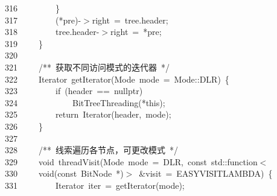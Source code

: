 \documentclass[11pt,a4paper]{ctexart}
\newcommand{\hlstd}[1]{\textcolor[rgb]{0.2,0.2,0.2}{#1}}
\newcommand{\hlcom}[1]{\textcolor[rgb]{0.59,0.59,0.59}{#1}}
\newcommand{\hlopt}[1]{\textcolor[rgb]{0.2,0.2,0.2}{#1}}
\newcommand{\hllin}[1]{\textcolor[rgb]{0.59,0.59,0.59}{#1}}
\newcommand{\hlkwa}[1]{\textcolor[rgb]{0.23,0.42,0.78}{#1}}
\newcommand{\hlkwb}[1]{\textcolor[rgb]{0.63,0,0.31}{#1}}
\newcommand{\hlkwc}[1]{\textcolor[rgb]{0,0.63,0.31}{#1}}
\newcommand{\hlkwd}[1]{\textcolor[rgb]{0.78,0.23,0.41}{#1}}
\begin{document}
\hllin{316\ }\hlstd{}\hlstd{\ \ \ \ \ \ \ \ }\hlstd{}\hlopt{\}}\\
\hllin{317\ }\hlstd{}\hlstd{\ \ \ \ \ \ \ \ }\hlstd{}\hlopt{({*}}\hlstd{pre}\hlopt{){-}$>$}\hlstd{right\ }\hlopt{=\ }\hlstd{tree}\hlopt{.}\hlstd{header}\hlopt{;}\\
\hllin{318\ }\hlstd{}\hlstd{\ \ \ \ \ \ \ \ }\hlstd{tree}\hlopt{.}\hlstd{header}\hlopt{{-}$>$}\hlstd{right\ }\hlopt{=\ {*}}\hlstd{pre}\hlopt{;}\\
\hllin{319\ }\hlstd{}\hlstd{\ \ \ \ }\hlstd{}\hlopt{\}}\\
\hllin{320\ }\hlstd{}\\
\hllin{321\ }\hlstd{}\hlstd{\ \ \ \ }\hlstd{}\hlcom{/{*}{*}\ 获取不同访问模式的迭代器\ {*}/}\hlstd{}\\
\hllin{322\ }\hlstd{}\hlstd{\ \ \ \ }\hlstd{Iterator\ }\hlkwd{getIterator}\hlstd{}\hlopt{(}\hlstd{Mode\ mode\ }\hlopt{=\ }\hlstd{}\hlkwc{Mode}\hlstd{}\hlopt{::}\hlstd{DLR}\hlopt{)\ \{}\\
\hllin{323\ }\hlstd{}\hlstd{\ \ \ \ \ \ \ \ }\hlstd{}\hlkwa{if\ }\hlstd{}\hlopt{(}\hlstd{header\ }\hlopt{==\ }\hlstd{}\hlkwc{nullptr}\hlstd{}\hlopt{)}\\
\hllin{324\ }\hlstd{}\hlstd{\ \ \ \ \ \ \ \ \ \ \ \ }\hlstd{}\hlkwd{BitTreeThreading}\hlstd{}\hlopt{({*}}\hlstd{}\hlkwa{this}\hlstd{}\hlopt{);}\\
\hllin{325\ }\hlstd{}\hlstd{\ \ \ \ \ \ \ \ }\hlstd{}\hlkwa{return\ }\hlstd{}\hlkwd{Iterator}\hlstd{}\hlopt{(}\hlstd{header}\hlopt{,\ }\hlstd{mode}\hlopt{);}\\
\hllin{326\ }\hlstd{}\hlstd{\ \ \ \ }\hlstd{}\hlopt{\}}\\
\hllin{327\ }\hlstd{}\\
\hllin{328\ }\hlstd{}\hlstd{\ \ \ \ }\hlstd{}\hlcom{/{*}{*}\ 线索遍历各节点，可更改模式\ {*}/}\hlstd{}\\
\hllin{329\ }\hlstd{}\hlstd{\ \ \ \ }\hlstd{}\hlkwb{void\ }\hlstd{}\hlkwd{threadVisit}\hlstd{}\hlopt{(}\hlstd{Mode\ mode\ }\hlopt{=\ }\hlstd{DLR}\hlopt{,\ }\hlstd{}\hlkwb{const\ }\hlstd{}\hlkwc{std}\hlstd{}\hlopt{::}\hlstd{function}\hlopt{$<$}\Righttorque\\
\hllin{330\ }\hlstd{}\hlstd{\ \ \ \ }\hlstd{}\hlkwb{void}\hlstd{}\hlopt{(}\hlstd{}\hlkwb{const\ }\hlstd{BitNode\ }\hlopt{{*})$>$\ \&}\hlstd{visit\ }\hlopt{=\ }\hlstd{EASY\textunderscore VISIT\textunderscore LAMBDA}\hlopt{)\ \{}\\
\hllin{331\ }\hlstd{}\hlstd{\ \ \ \ \ \ \ \ }\hlstd{Iterator\ iter\ }\hlopt{=\ }\hlstd{}\hlkwd{getIterator}\hlstd{}\hlopt{(}\hlstd{mode}\hlopt{);}\\
\end{document}
